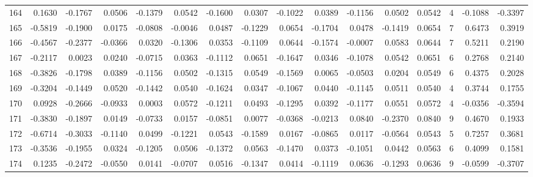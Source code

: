 \begin{tabular}{lrrrrrrrrrrrrrrr}
164 &      0.1630 & -0.1767 &  0.0506 & -0.1379 &  0.0542 & -0.1600 &  0.0307 & -0.1022 &  0.0389 & -0.1156 &   0.0502 &     0.0542 &      4 &                   -0.1088 &                    -0.3397 \\
165 &     -0.5819 & -0.1900 &  0.0175 & -0.0808 & -0.0046 &  0.0487 & -0.1229 &  0.0654 & -0.1704 &  0.0478 &  -0.1419 &     0.0654 &      7 &                    0.6473 &                     0.3919 \\
166 &     -0.4567 & -0.2377 & -0.0366 &  0.0320 & -0.1306 &  0.0353 & -0.1109 &  0.0644 & -0.1574 & -0.0007 &   0.0583 &     0.0644 &      7 &                    0.5211 &                     0.2190 \\
167 &     -0.2117 &  0.0023 &  0.0240 & -0.0715 &  0.0363 & -0.1112 &  0.0651 & -0.1647 &  0.0346 & -0.1078 &   0.0542 &     0.0651 &      6 &                    0.2768 &                     0.2140 \\
168 &     -0.3826 & -0.1798 &  0.0389 & -0.1156 &  0.0502 & -0.1315 &  0.0549 & -0.1569 &  0.0065 & -0.0503 &   0.0204 &     0.0549 &      6 &                    0.4375 &                     0.2028 \\
169 &     -0.3204 & -0.1449 &  0.0520 & -0.1442 &  0.0540 & -0.1624 &  0.0347 & -0.1067 &  0.0440 & -0.1145 &   0.0511 &     0.0540 &      4 &                    0.3744 &                     0.1755 \\
170 &      0.0928 & -0.2666 & -0.0933 &  0.0003 &  0.0572 & -0.1211 &  0.0493 & -0.1295 &  0.0392 & -0.1177 &   0.0551 &     0.0572 &      4 &                   -0.0356 &                    -0.3594 \\
171 &     -0.3830 & -0.1897 &  0.0149 & -0.0733 &  0.0157 & -0.0851 &  0.0077 & -0.0368 & -0.0213 &  0.0840 &  -0.2370 &     0.0840 &      9 &                    0.4670 &                     0.1933 \\
172 &     -0.6714 & -0.3033 & -0.1140 &  0.0499 & -0.1221 &  0.0543 & -0.1589 &  0.0167 & -0.0865 &  0.0117 &  -0.0564 &     0.0543 &      5 &                    0.7257 &                     0.3681 \\
173 &     -0.3536 & -0.1955 &  0.0324 & -0.1205 &  0.0506 & -0.1372 &  0.0563 & -0.1470 &  0.0373 & -0.1051 &   0.0442 &     0.0563 &      6 &                    0.4099 &                     0.1581 \\
174 &      0.1235 & -0.2472 & -0.0550 &  0.0141 & -0.0707 &  0.0516 & -0.1347 &  0.0414 & -0.1119 &  0.0636 &  -0.1293 &     0.0636 &      9 &                   -0.0599 &                    -0.3707 \\

\end{tabular}
